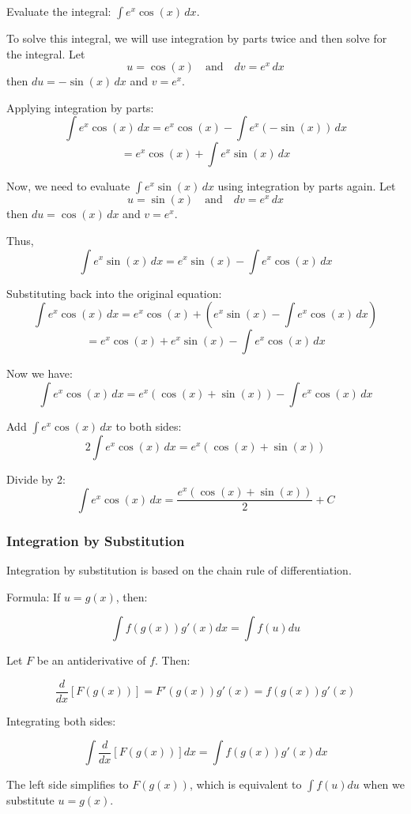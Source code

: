 \begin{exercise}
Evaluate the integral: $\int e^x \cos(x) \, dx$.
\end{exercise}
\begin{solution}
To solve this integral, we will use integration by parts twice and then solve for the integral. Let
\[
u = \cos(x) \quad \text{and} \quad dv = e^x \, dx
\]
then \( du = -\sin(x) \, dx \) and \( v = e^x \).

Applying integration by parts:
\[
\int e^x \cos(x) \, dx = e^x \cos(x) - \int e^x (-\sin(x)) \, dx
\]
\[
= e^x \cos(x) + \int e^x \sin(x) \, dx
\]

Now, we need to evaluate \( \int e^x \sin(x) \, dx \) using integration by parts again. Let
\[
u = \sin(x) \quad \text{and} \quad dv = e^x \, dx
\]
then \( du = \cos(x) \, dx \) and \( v = e^x \).

Thus,
\[
\int e^x \sin(x) \, dx = e^x \sin(x) - \int e^x \cos(x) \, dx
\]

Substituting back into the original equation:
\[
\int e^x \cos(x) \, dx = e^x \cos(x) + (e^x \sin(x) - \int e^x \cos(x) \, dx)
\]
\[
= e^x \cos(x) + e^x \sin(x) - \int e^x \cos(x) \, dx
\]

Now we have:
\[
\int e^x \cos(x) \, dx = e^x (\cos(x) + \sin(x)) - \int e^x \cos(x) \, dx
\]

Add \( \int e^x \cos(x) \, dx \) to both sides:
\[
2 \int e^x \cos(x) \, dx = e^x (\cos(x) + \sin(x))
\]

Divide by 2:
\[
\int e^x \cos(x) \, dx = \frac{e^x (\cos(x) + \sin(x))}{2} + C
\]
\end{solution}


\subsubsection{Integration by Substitution}

\begin{definition}
Integration by substitution is based on the chain rule of differentiation.

Formula:
If $u = g(x)$, then:

$$
\int f(g(x))g'(x)dx = \int f(u)du
$$
\end{definition}

\begin{theorem}
Let $F$ be an antiderivative of $f$. Then:

$$
\frac{d}{dx}[F(g(x))] = F'(g(x))g'(x) = f(g(x))g'(x)
$$

Integrating both sides:

$$
\int \frac{d}{dx}[F(g(x))] dx = \int f(g(x))g'(x)dx
$$

The left side simplifies to $F(g(x))$, which is equivalent to $\int f(u)du$ when we substitute $u = g(x)$.
\end{theorem}


